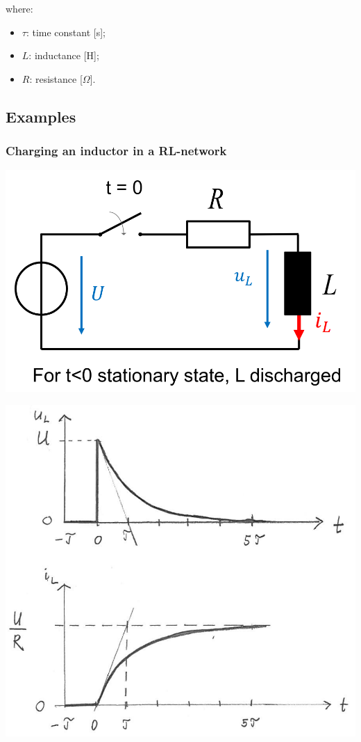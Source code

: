 \documentclass{article}
\begin{document}
where:
\begin{itemize}
    \item $\tau$: time constant [s];
    \item $L$: inductance [H];
    \item $R$: resistance [$\Omega$].
\end{itemize}

\subsection{Examples}
\subsubsection{Charging an inductor in a RL-network}
\begin{center}
    \includegraphics[width=.5\textwidth]{media/inductor_ex1.png}
\end{center}


\begin{center}
    \includegraphics[width=.45\textwidth]{media/inductor_ex1_graph.png}
\end{center}

\newpage
\end{document}
